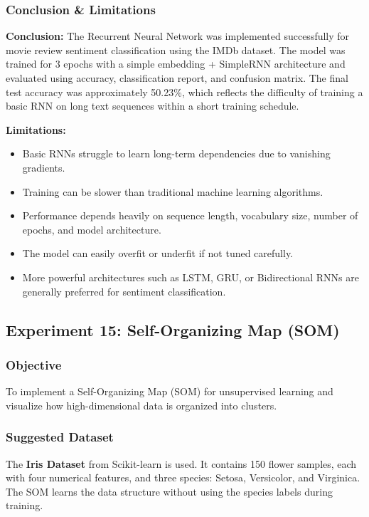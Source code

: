 \documentclass[a4paper,11pt]{article}
\begin{document}
\begin{itemize}
\subsubsection{Conclusion \& Limitations}

\textbf{Conclusion:} The Recurrent Neural Network was implemented successfully for movie review sentiment classification using the IMDb dataset. The model was trained for 3 epochs with a simple embedding + SimpleRNN architecture and evaluated using accuracy, classification report, and confusion matrix. The final test accuracy was approximately 50.23\%, which reflects the difficulty of training a basic RNN on long text sequences within a short training schedule.

\textbf{Limitations:}
\begin{itemize}
    \item Basic RNNs struggle to learn long-term dependencies due to vanishing gradients.
    \item Training can be slower than traditional machine learning algorithms.
    \item Performance depends heavily on sequence length, vocabulary size, number of epochs, and model architecture.
    \item The model can easily overfit or underfit if not tuned carefully.
    \item More powerful architectures such as LSTM, GRU, or Bidirectional RNNs are generally preferred for sentiment classification.
\end{itemize}





\subsection{Experiment 15: Self-Organizing Map (SOM)}

\subsubsection{Objective}
To implement a Self-Organizing Map (SOM) for unsupervised learning and visualize how high-dimensional data is organized into clusters.

\subsubsection{Suggested Dataset}
The \textbf{Iris Dataset} from Scikit-learn is used. It contains 150 flower samples, each with four numerical features, and three species: Setosa, Versicolor, and Virginica. The SOM learns the data structure without using the species labels during training.


\end{itemize}
\end{document}
